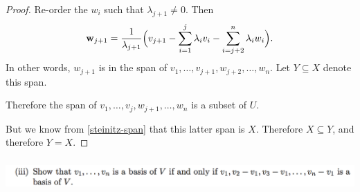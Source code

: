 \documentclass[12pt]{article}
\begin{document}
\begin{proof}

  Re-order the $w_i$ such that $\lambda_{j+1} \neq 0$. Then
  \begin{align*}
    \mathbf w_{j+1} = \frac{1}{\lambda_{j+1}}\Big(v_{j+1} - \sum_{i=1}^j \lambda_iv_i - \sum_{i=j+2}^n\lambda_iw_i\Big).
  \end{align*}
  In other words, $w_{j+1}$ is in the span of
  $v_1, \ldots, v_{j+1}, w_{j+2}, \ldots, w_n$. Let $Y \subseteq X$ denote this
  span.

  Therefore the span of $v_1, \ldots, v_{j}, w_{j+1}, \ldots, w_n$ is a subset
  of $U$.

  But we know from \ref{steinitz-span} that this latter span is $X$. Therefore
  $X \subseteq Y$, and therefore $Y = X$.
\end{proof}



\newpage
\subsubsection*{}
\begin{mdframed}
\includegraphics[width=400pt]{img/oxford-prelims-2017-A-1-1-3.png}
\end{mdframed}
\end{document}
